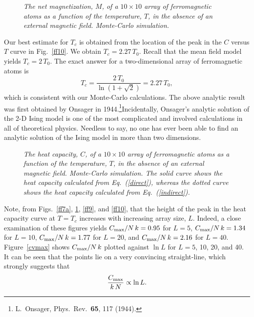 \begin{figure}
\epsfysize=3in
\centerline{}
\caption{\em The net magnetization, $M$, of a  $10\times 10$ array of ferromagnetic atoms as a
function of the temperature, $T$, in the absence of an external magnetic
field. Monte-Carlo simulation.}
\end{figure}

Our best estimate for $T_c$ is obtained from the location of the peak in the $C$ versus $T$
curve in Fig.~\ref{ff10}. We obtain $T_c=2.27\,T_0$. Recall that the mean field model
yields $T_c = 2\,T_0$. The exact answer for a two-dimensional array of ferromagnetic atoms
is
\begin{equation}
T_c = \frac{2\,T_0}{\ln(1+\sqrt{2})} = 2.27\,T_0,
\end{equation}
which is consistent with our Monte-Carlo calculations.
The above analytic result was first obtained by Onsager in 1944.\footnote{L.~Onsager,
Phys.\ Rev.\ {\bf 65}, 117 (1944).}\@ Incidentally, Onsager's analytic
solution of the 2-D Ising model is one of the most complicated and involved calculations
in all of theoretical physics. Needless to say, no one has ever been able to find an
analytic solution of the Ising model in more than two dimensions.

\begin{figure}
\epsfysize=3in
\centerline{}
\caption{\em The heat capacity, $C$, of a  $10\times 10$ array of ferromagnetic atoms as a
function of the temperature, $T$, in the absence of an external magnetic
field. Monte-Carlo simulation. The solid curve shows the heat capacity calculated
from Eq.~(\ref{direct}), whereas the dotted curve shows the heat capacity calculated
from Eq.~(\ref{indirect}).}\label{ff8}
\end{figure}

Note, from Figs.~\ref{ff7a}, \ref{ff8}, \ref{ff9}, and \ref{ff10},  that the height of the peak in the heat capacity curve at $T=T_c$ increases with increasing array
size, $L$. Indeed, a close examination of these figures yields
 $C_{\rm max}/N\,k = 0.95$ for $L=5$, $C_{\rm max}/N\,k = 1.34$ for $L=10$,
$C_{\rm max}/N\,k = 1.77$ for $L=20$, and $C_{\rm max}/N\,k = 2.16$ for $L=40$.
Figure~\ref{cvmax} shows $C_{\rm max}/N\,k$ plotted against $\ln L$ for $L=5$, 10, 20, and 40.
It can be seen that the points lie on a very convincing straight-line, which strongly suggests that
\begin{equation}
\frac{C_{\rm max}}{k\,N} \propto \ln L.
\end{equation}

